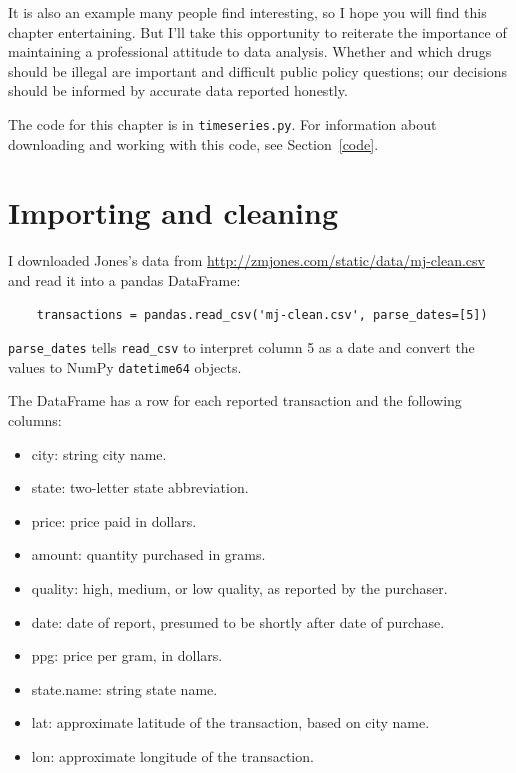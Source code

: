 \documentclass[12pt]{book}
\begin{document}
It is also an example many people find interesting, so I hope you will
find this chapter entertaining.  But I'll take this opportunity to
reiterate the importance of maintaining a professional attitude to
data analysis.  Whether and which drugs should be illegal are
important and difficult public policy questions; our decisions should
be informed by accurate data reported honestly.

The code for this chapter is in {\tt timeseries.py}.  For information
about downloading and working with this code, see Section~\ref{code}.


\section{Importing and cleaning}

I downloaded Jones's data from
\url{http://zmjones.com/static/data/mj-clean.csv} and read it
into a pandas DataFrame:

\begin{verbatim}
    transactions = pandas.read_csv('mj-clean.csv', parse_dates=[5])
\end{verbatim}

\verb"parse_dates" tells \verb"read_csv" to interpret column 5
as a date and convert the values to NumPy {\tt datetime64} objects.

The DataFrame has a row for each reported transaction and 
the following columns:

\begin{itemize}

\item city: string city name.

\item state: two-letter state abbreviation.

\item price: price paid in dollars.

\item amount: quantity purchased in grams.

\item quality: high, medium, or low quality, as reported by the purchaser.

\item date: date of report, presumed to be shortly after date of purchase.

\item ppg: price per gram, in dollars.

\item state.name: string state name.

\item lat: approximate latitude of the transaction, based on city name.

\item lon: approximate longitude of the transaction.

\end{itemize}
\end{document}
